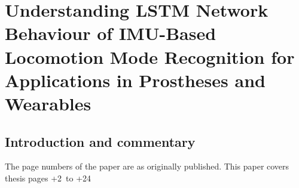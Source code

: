 \chapter{Understanding LSTM Network Behaviour of IMU-Based Locomotion Mode Recognition for Applications in Prostheses and Wearables}

\section{Introduction and commentary}

\newcommand\x{\value{page}}
The page numbers of the paper are as originally published. This paper covers thesis pages \the\numexpr\x+2\relax \ to \the\numexpr\x+24\relax

\clearpage
